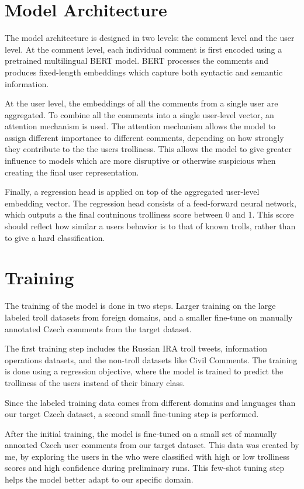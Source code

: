\documentclass[twoside]{ctuthesis}
\theoremstyle{plain}
\theoremstyle{definition}
\theoremstyle{note}
\begin{document}
\section{Model Architecture}
The model architecture is designed in two levels: the comment level and the user level. At the comment level, each individual comment is first encoded using a pretrained multilingual BERT model. BERT processes the comments and produces fixed-length embeddings which capture both syntactic and semantic information.\par
At the user level, the embeddings of all the comments from a single user are aggregated. To combine all the comments into a single user-level vector, an attention mechanism is used. The attention mechanism allows the model to assign different importance to different comments, depending on how strongly they contribute to the the users trolliness. This allows the model to give greater influence to models which are more disruptive or otherwise suspicious when creating the final user representation.\par
Finally, a regression head is applied on top of the aggregated user-level embedding vector. The regression head consists of a feed-forward neural network, which outputs a the final coutninous trolliness score between 0 and 1. This score should reflect how similar a users behavior is to that of known trolls, rather than to give a hard classification.\par

\section{Training}
The training of the model is done in two steps. Larger training on the large labeled troll datasets from foreign domains, and a smaller fine-tune on manually annotated Czech comments from the target dataset.\par
The first training step includes the Russian IRA troll tweets, information operations datasets, and the non-troll datasets like Civil Comments. The training is done using a regression objective, where the model is trained to predict the trolliness of the users instead of their binary class.\par
Since the labeled training data comes from different domains and languages than our target Czech dataset, a second small fine-tuning step is performed.\par
After the initial training, the model is fine-tuned on a small set of manually annoated Czech user comments from our target dataset. This data was created by me, by exploring the users in the who were classified with high or low trolliness scores and high confidence during preliminary runs. This few-shot tuning step helps the model better adapt to our specific domain.\par
\end{document}
